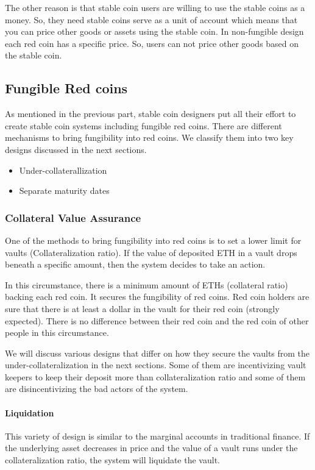 The other reason is that stable coin users are willing to use the stable coins as a money. So, they need stable coins serve as a unit of account which means that you can price other goods or assets using the stable coin. In non-fungible design each red coin has a specific price. So, users can not price other goods based on the stable coin.


\subsection{Fungible Red coins}
As mentioned in the previous part, stable coin designers put all their effort to create stable coin systems including fungible red coins. There are different mechanisms to bring fungibility into red coins. We classify them into two key designs discussed in the next sections.

\begin{itemize}
  \item Under-collaterallization
  \item Separate maturity dates
\end{itemize} 


\subsubsection{Collateral Value Assurance}

One of the methods to bring fungibility into red coins is to set a lower limit for vaults (Collateralization ratio). If the value of deposited ETH in a vault drops beneath a specific amount, then the system decides to take an action. 

In this circumstance, there is a minimum amount of ETHs (collateral ratio)  backing each red coin. It secures the fungibility of red coins. Red coin holders are sure that there is at least a dollar in the vault for their red coin  (strongly expected). There is no difference between their red coin and the red coin of other people in this circumstance.

We will discuss various designs that differ on how they secure the vaults from the under-collateralization in the next sections. Some of them are incentivizing vault keepers to keep their deposit more than collateralization ratio and some of them are disincentivizing the bad actors of the system.
 
\paragraph{Liquidation}
This variety of design is similar to the marginal accounts in traditional finance. If the underlying asset decreases in price and the value of a vault runs under the collateralization ratio, the system will liquidate the vault.

